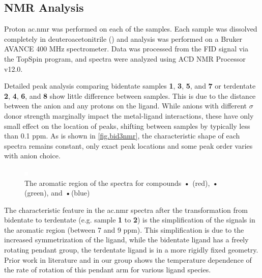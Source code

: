 \subsection{NMR Analysis}

Proton \gls{ac.nmr} was performed on each of the samples. Each sample was dissolved completely in deuteroacetonitrile () and analysis was performed on a Bruker AVANCE 400 MHz spectrometer. Data was processed from the FID signal via the TopSpin program, and spectra were analyzed using ACD NMR Processor v12.0. 

Detailed peak analysis comparing bidentate samples \textbf{1}, \textbf{3}, \textbf{5}, and \textbf{7} or terdentate \textbf{2}, \textbf{4}, \textbf{6}, and \textbf{8} show little difference between samples. This is due to the distance between the anion and any protons on the ligand. While anions with different $\sigma$ donor strength marginally impact the metal-ligand interactions, these have only small effect on the location of peaks, shifting between samples by typically less than 0.1 ppm. As is shown in \autoref{fig.bid3nmr}, the characteristic shape of each spectra remains constant, only exact peak locations and some peak order varies with anion choice. 

\begin{figure}[!htbp]
 \begin{center}
  \includegraphics[clip=true]{images/insertgraphic.eps}
 \end{center}
\caption[The aromatic region of the \texorpdfstring{}{1H}  spectra of 3 bidentate compounds]{The aromatic region of the \texorpdfstring{}{1H}  spectra for compounds \textbf{•} (red), \textbf{•} (green), and \textbf{•}(blue)}
\label{fig.bid3nmr}
\end{figure} 

The characteristic feature in the \gls{ac.nmr} spectra after the transformation from bidentate to terdentate (e.g. sample \textbf{1} to \textbf{2}) is the simplification of the signals in the aromatic region (between 7 and 9 ppm). This simplification is due to the increased symmetrization of the ligand, while the  bidentate ligand has a freely rotating pendant group, the  terdentate ligand is in a more rigidly fixed geometry. Prior work in literature and in our group shows the temperature dependence of the rate of rotation of this pendant arm for various ligand species. 


